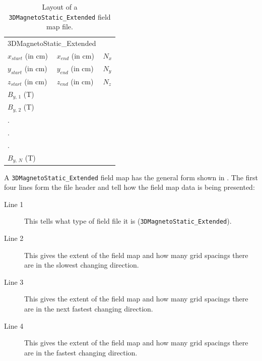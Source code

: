 \begin{table}[ht!]
    \caption{Layout of a \texttt{3DMagnetoStatic\_Extended} field map file.}
    \label{tab:3DMagnetoStatic_Extended}
    \begin{center}
    \begin{tabular}{lll}
      \hline
      \multicolumn{2}{l}{3DMagnetoStatic\_Extended}  &           \\
      $x_{start}$ (in cm)       & $x_{end}$ (in cm)  & $N_{x}$   \\
      $y_{start}$ (in cm)       & $y_{end}$ (in cm)  & $N_{y}$   \\
      $z_{start}$ (in cm)       & $z_{end}$ (in cm)  & $N_{z}$   \\
      $B_{y,\,1}$ (T)           &                    &           \\
      $B_{y,\,2}$ (T)           &                    &           \\
      .                         &                    &           \\
      .                         &                    &           \\
      .                         &                    &           \\
      $B_{y,\,N}$ (T)           &                    &           \\
      \hline
    \end{tabular}
    \end{center}
\end{table}

A \texttt{3DMagnetoStatic\_Extended} field map has the general form shown in . The first four lines form the file header and tell \opalt how the field map data is being presented:

\begin{description}
\item[Line 1] This tells \opalt what type of field file it is (\texttt{3DMagnetoStatic\_Extended}).
\item[Line 2] This gives the extent of the field map and how many grid spacings there are in the slowest changing direction.
\item[Line 3] This gives the extent of the field map and how many grid spacings there are in the next fastest changing direction.
\item[Line 4] This gives the extent of the field map and how many grid spacings there are in the fastest changing direction.
\end{description}

